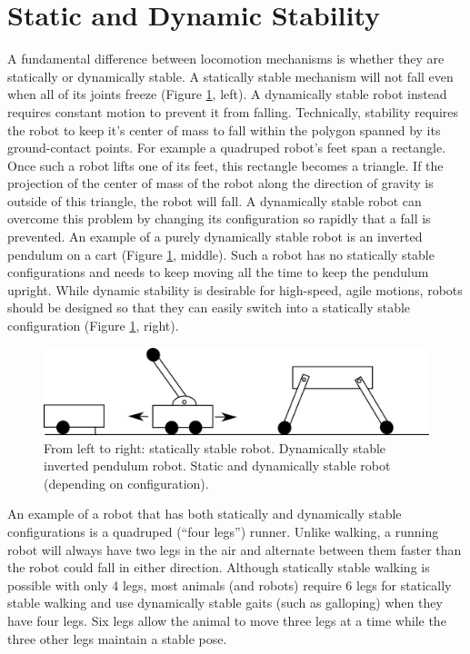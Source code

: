 \section{Static and Dynamic Stability}\label{sec:stability}
A fundamental difference between locomotion mechanisms is whether they are statically or dynamically stable. A statically stable mechanism will not fall even when all of its joints freeze (Figure \ref{fig:stability}, left). A dynamically stable robot instead requires constant motion to prevent it from falling. Technically, stability requires the robot to keep it's center of mass to fall within the polygon spanned by its ground-contact points. For example a quadruped robot's feet span a rectangle. Once such a robot lifts one of its feet, this rectangle becomes a triangle. If the projection of the center of mass of the robot along the direction of gravity is outside of this triangle, the robot will fall. A dynamically stable robot can overcome this problem by changing its configuration so rapidly that a fall is prevented. An example of a purely dynamically stable robot is an inverted pendulum on a cart  (Figure \ref{fig:stability}, middle). Such a robot has no statically stable configurations and needs to keep moving all the time to keep the pendulum upright. While dynamic stability is desirable for high-speed, agile motions, robots should be designed so that they can easily switch into a statically stable configuration (Figure \ref{fig:stability}, right). 

\begin{figure}
	\centering
		\includegraphics[width=\textwidth]{figs/stability.png}
	\caption{From left to right: statically stable robot. Dynamically stable inverted pendulum robot. Static and dynamically stable robot (depending on configuration).}
	\label{fig:stability}
\end{figure}

An example of a robot that has both statically and dynamically stable configurations is a quadruped (``four legs'') runner. Unlike walking, a running robot will always have two legs in the air and alternate between them faster than the robot could fall in either direction. Although statically stable walking is possible with only 4 legs, most animals (and robots) require 6 legs for statically stable walking and use dynamically stable gaits (such as galloping) when they have four legs. Six legs allow the animal to move three legs at a time while the three other legs maintain a stable pose.


